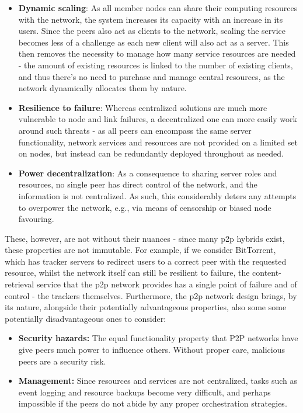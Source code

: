 \begin{itemize}
    \item \textbf{Dynamic scaling}: As all member nodes can share their computing resources with the network, the system increases its capacity with an increase in its users.
        Since the peers also act as clients to the network, scaling the service becomes less of a challenge as each new client will also act as a server.
        This then removes the necessity to manage how many service resources are needed - the amount of existing resources is linked to the number of existing clients, and thus there's no need to purchase and manage central resources, as the network dynamically allocates them by nature.
    \item \textbf{Resilience to failure}: Whereas centralized solutions are much more vulnerable to node and link failures, a decentralized one can more easily work around such threats - as all peers can encompass the same server functionality, network services and resources are not provided on a limited set on nodes, but instead can be redundantly deployed throughout as needed.
    \item \textbf{Power decentralization}: As a consequence to sharing server roles and resources, no single peer has direct control of the network, and the information is not centralized.
        As such, this considerably deters any attempts to overpower the network, e.g., via means of censorship or biased node favouring.
\end{itemize}

    These, however, are not without their nuances - since many \gls{p2p} hybrids exist, these properties are not immutable.
    For example, if we consider BitTorrent, which has tracker servers to redirect users to a correct peer with the requested resource, whilst the network itself can still be resilient to failure, the content-retrieval service that the \gls{p2p} network provides has a single point of failure and of control - the trackers themselves.
    Furthermore, the \gls{p2p} network design brings, by its nature, alongside their potentially advantageous properties, also some some potentially disadvantageous ones to consider:

\begin{itemize}
    \item \textbf{Security hazards:} The equal functionality property that \gls{P2P} networks have give peers much power to influence others.
        Without proper care, malicious peers are a security risk.
    \item \textbf{Management:} Since resources and services are not centralized, tasks such as event logging and resource backups become very difficult, and perhaps impossible if the peers do not abide by any proper orchestration strategies.
\end{itemize}

